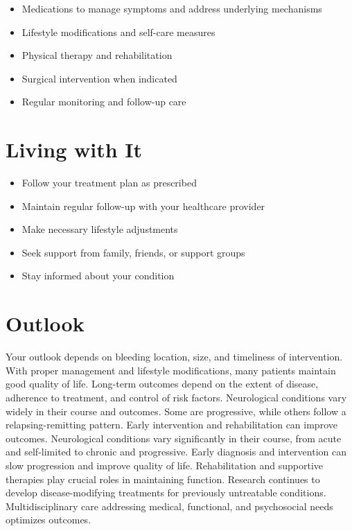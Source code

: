\begin{itemize}[noitemsep]
  \item Medications to manage symptoms and address underlying mechanisms
  \item Lifestyle modifications and self-care measures
  \item Physical therapy and rehabilitation
  \item Surgical intervention when indicated
  \item Regular monitoring and follow-up care
\end{itemize}
\section{Living with It}
\begin{itemize}[noitemsep]
  \item Follow your treatment plan as prescribed
  \item Maintain regular follow-up with your healthcare provider
  \item Make necessary lifestyle adjustments
  \item Seek support from family, friends, or support groups
  \item Stay informed about your condition
\end{itemize}
\section{Outlook}
Your outlook depends on bleeding location, size, and timeliness of intervention. With proper management and lifestyle modifications, many patients maintain good quality of life. Long-term outcomes depend on the extent of disease, adherence to treatment, and control of risk factors. Neurological conditions vary widely in their course and outcomes. Some are progressive, while others follow a relapsing-remitting pattern. Early intervention and rehabilitation can improve outcomes. Neurological conditions vary significantly in their course, from acute and self-limited to chronic and progressive. Early diagnosis and intervention can slow progression and improve quality of life. Rehabilitation and supportive therapies play crucial roles in maintaining function. Research continues to develop disease-modifying treatments for previously untreatable conditions. Multidisciplinary care addressing medical, functional, and psychosocial needs optimizes outcomes.
